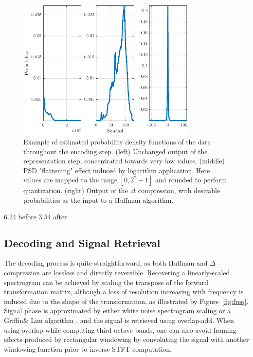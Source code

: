 \documentclass[preprint,12pt]{elsarticle}
\begin{document}
\begin{figure}[htbp]
	\centering
		\includegraphics[width=0.8\textwidth]{pdf.eps}
	\caption{Example of estimated probability density functions of the data throughout the encoding step. (left) Unchanged output of the representation step, concentrated towards very low values. (middle) PSD "flattening" effect induced by logarithm application. Here values are mapped to the range $[0, 2^7-1]$ and rounded to perform quantization. (right) Output of the $\Delta$ compression, with desirable probabilities as the input to a Huffman algorithm.}
	\label{fig:pdf}
\end{figure}
6.24 before
3.54 after

\subsection{Decoding and Signal Retrieval}

The decoding process is quite straightforward, as both Huffman and $\Delta$ compression are lossless and directly reversible. Recovering a linearly-scaled spectrogram can be achieved by scaling the transpose of the forward transformation matrix, although a loss of resolution increasing with frequency is induced due to the shape of the transformation, as illustrated by Figure~\ref{fig:freq}. Signal phase is approximated by either white noise spectrogram scaling or a Griffin\& Lim algorithm \cite{griffin1984}, and the signal is retrieved using overlap-add. When using overlap while computing third-octave bands, one can also avoid framing effects produced by rectangular windowing by convoluting the signal with another windowing function prior to inverse-STFT computation.\\
\end{document}
